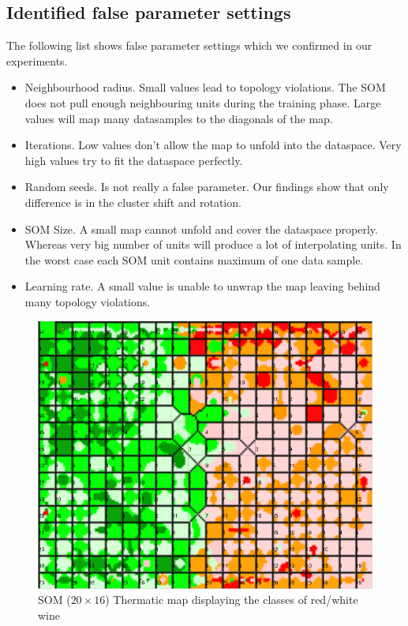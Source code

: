 \documentclass{acm_proc_article-sp}
\begin{document}
\subsection{Identified false parameter settings}

The following list shows false parameter settings which we confirmed in our experiments.

\begin{itemize}
    \item Neighbourhood radius. Small values lead to topology violations.
        The SOM does not pull enough neighbouring units during the training phase.
        Large values will map many datasamples to the diagonals of the map.
    \item Iterations. Low values don't allow the map to unfold into the dataspace.
        Very high values try to fit the dataspace perfectly.
    \item Random seeds. Is not really a false parameter. Our findings show that
        only difference is in the cluster shift and rotation.
    \item SOM Size. A small map cannot unfold and cover the dataspace properly. Whereas very
        big number of units will produce a lot of interpolating units. In the worst case each
        SOM unit contains maximum of one data sample.
    \item Learning rate. A small value is unable to unwrap the map leaving behind many topology violations.
\end{itemize}

\begin{figure}
\centering
    \centering
    \includegraphics[width=0.7\linewidth]{img/wine-newmid-thermatic-class-map}
    \caption{SOM ($20\times16$) Thermatic map displaying the classes of red/white wine}
    \label{fig:wine-newmid-thermatic-class-map}
\end{figure}



\end{document}
